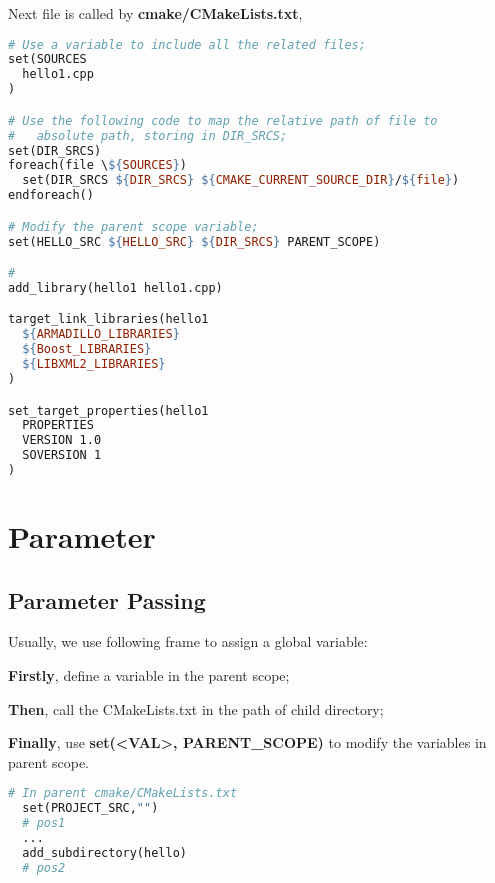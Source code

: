 \documentclass[11pt]{article}
\begin{document}
Next file is called by \textbf{cmake/CMakeLists.txt}, 
\begin{lstlisting}[language=make,label=lst:2lst,caption=Frame of the \textbf{cmake/hello/CMakeLists.txt}]
# Use a variable to include all the related files;
set(SOURCES 
  hello1.cpp
)

# Use the following code to map the relative path of file to 
#   absolute path, storing in DIR_SRCS;
set(DIR_SRCS)
foreach(file \${SOURCES})
  set(DIR_SRCS ${DIR_SRCS} ${CMAKE_CURRENT_SOURCE_DIR}/${file})
endforeach()

# Modify the parent scope variable;
set(HELLO_SRC ${HELLO_SRC} ${DIR_SRCS} PARENT_SCOPE)

# 
add_library(hello1 hello1.cpp)

target_link_libraries(hello1
  ${ARMADILLO_LIBRARIES}
  ${Boost_LIBRARIES}
  ${LIBXML2_LIBRARIES}
)

set_target_properties(hello1
  PROPERTIES
  VERSION 1.0
  SOVERSION 1
)
\end{lstlisting}



\clearpage
\section{Parameter}%
\label{sec:parameter}

\subsection{Parameter Passing}%
\label{sub:parameter_passing}

Usually, we use following frame to assign a global variable:

\textbf{Firstly}, define a variable in the parent scope; 

\textbf{Then}, call the CMakeLists.txt in the path of child directory;

\textbf{Finally}, use \textbf{set(<VAL>, PARENT\_SCOPE)} to modify the variables in parent scope.
\begin{lstlisting}[language=make,label=lst:3lst,caption=Parameter passing]
  # In parent cmake/CMakeLists.txt
  set(PROJECT_SRC,"")
  # pos1
  ...   
  add_subdirectory(hello)
  # pos2
\end{lstlisting}
\end{document}
